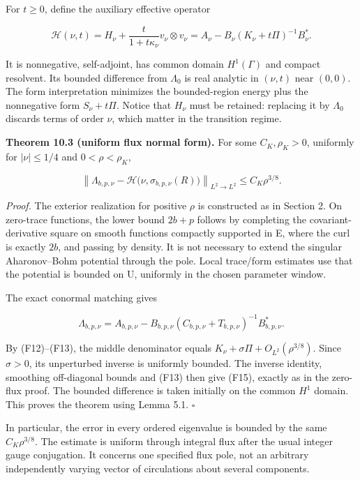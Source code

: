 \documentclass[11pt]{article}
\begin{document}
For \(t\geq0\), define the auxiliary effective operator

\[\mathcal H(\nu,t)=H_\nu+\frac{t}{1+t\kappa_\nu}v_\nu\otimes v_\nu
=A_\nu-B_\nu(K_\nu+t\Pi)^{-1}B_\nu^*.\tag{F14}\]

It is nonnegative, self-adjoint, has common domain \(H^1(\Gamma)\) and
compact resolvent. Its bounded difference from \(\Lambda_0\) is real
analytic in \((\nu,t)\) near \((0,0)\). The form interpretation
minimizes the bounded-region energy plus the nonnegative form
\(S_\nu+t\Pi\). Notice that \(H_\nu\) must be retained: replacing it by
\(\Lambda_0\) discards terms of order \(\nu\), which matter in the
transition regime.

\textbf{Theorem 10.3 (uniform flux normal form).} For some
\(C_K,\rho_K>0\), uniformly for \(|\nu|\leq1/4\) and \(0<\rho<\rho_K\),

\[\left\|\Lambda_{b,p,\nu}-\mathcal H\bigl(\nu,\sigma_{b,p,\nu}(R)\bigr)\right\|_{L^2\to L^2}
\leq C_K\rho^{3/8}.\tag{F15}\]

\emph{Proof.} The exterior realization for positive \(\rho\) is
constructed as in Section 2. On zero-trace functions, the lower bound
\(2b+p\) follows by completing the covariant-derivative square on smooth
functions compactly supported in E, where the curl is exactly \(2b\),
and passing by density. It is not necessary to extend the singular
Aharonov--Bohm potential through the pole. Local trace/form estimates
use that the potential is bounded on U, uniformly in the chosen
parameter window.

The exact conormal matching gives

\[\Lambda_{b,p,\nu}=A_{b,p,\nu}-B_{b,p,\nu}
(C_{b,p,\nu}+T_{b,p,\nu})^{-1}B_{b,p,\nu}^*.\]

By (F12)--(F13), the middle denominator equals
\(K_\nu+\sigma\Pi+O_{L^2}(\rho^{3/8})\). Since \(\sigma>0\), its
unperturbed inverse is uniformly bounded. The inverse identity,
smoothing off-diagonal bounds and (F13) then give (F15), exactly as in
the zero-flux proof. The bounded difference is taken initially on the
common \(H^1\) domain. This proves the theorem using Lemma 5.1.
\(\square\)

In particular, the error in every ordered eigenvalue is bounded by the
same \(C_K\rho^{3/8}\). The estimate is uniform through integral flux
after the usual integer gauge conjugation. It concerns one specified
flux pole, not an arbitrary independently varying vector of circulations
about several components.
\end{document}

